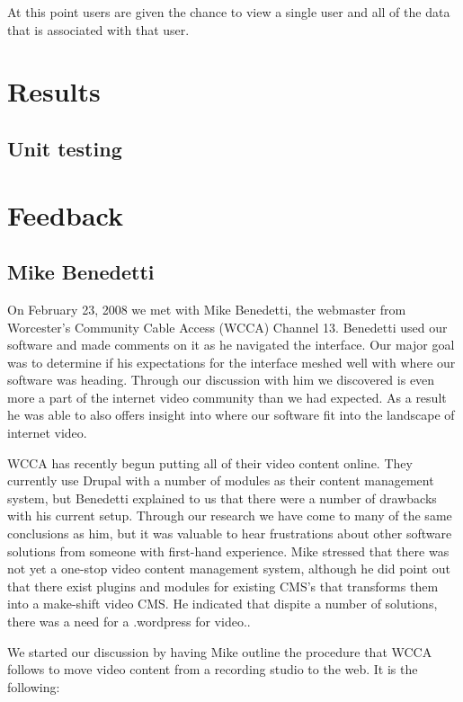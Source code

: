 \documentclass[a4paper,12pt]{report}
\begin{document}
At this point users are given the chance to view a single user and all of the data that is associated with that user.

\chapter{Results}

\section{Unit testing}

\chapter{Feedback}

\section{Mike Benedetti}

On February 23, 2008 we met with Mike Benedetti, the webmaster from Worcester's Community Cable Access (WCCA) Channel 
13. 
Benedetti used our software and made comments on it as he navigated the interface. 
Our major goal was to determine if his expectations for the interface meshed well with where our software was heading. 
Through our discussion with him we discovered is even more a part of the internet video community than we had expected. 
As a result he was able to also offers insight into where our software fit into the landscape of internet video.

WCCA has recently begun putting all of their video content online. 
They currently use Drupal with a number of modules as their content management system, but Benedetti explained to us 
that there were a number of drawbacks with his current setup. 
Through our research we have come to many of the same conclusions as him, but it was valuable to hear frustrations about 
other software solutions from someone with first-hand experience. 
Mike stressed that there was not yet a one-stop video content management system, although he did point out that there 
exist plugins and modules for existing CMS's that transforms them into a make-shift video CMS. 
He indicated that dispite a number of solutions, there was a need for a .wordpress for video..

We started our discussion by having Mike outline the procedure that WCCA follows to move video content from a recording 
studio to the web. 
It is the following: 
\end{document}
